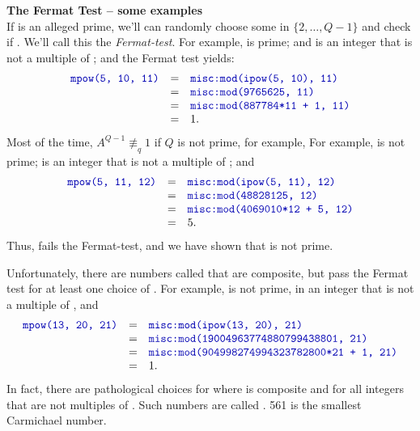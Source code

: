 \documentclass{article}
\newcommand{\nequivq}{{\not\equiv}_q}
\begin{document}
  \noindent%
  \textbf{The Fermat Test -- some examples}\\
  If  is an alleged prime, we'll can randomly choose some  in $\{2, \ldots, Q-1\}$
  and check if .  We'll call this the \emph{Fermat-test}.
  For example,  is prime; and  is an integer that is not a multiple of ;
  and the Fermat test yields:
  \begin{displaymath}\begin{array}{rcl}
    \code{mpow(5, 10, 11)} &=& \code{misc:mod(ipow(5, 10), 11)}\\
			   &=& \code{misc:mod(9765625, 11)}\\
			   &=& \code{misc:mod(887784*11 + 1, 11)}\\
			   &=& 1.
  \end{array}\end{displaymath}
   Most of the time, $A^{Q-1} \nequivq 1$ if $Q$ is not prime, for example,
   For example,  is not prime;  is an integer that is not a multiple of ; and
   \begin{displaymath}\begin{array}{rcl}
     \code{mpow(5, 11, 12)} &=& \code{misc:mod(ipow(5, 11), 12)}\\
			    &=& \code{misc:mod(48828125, 12)}\\
			    &=& \code{misc:mod(4069010*12 + 5, 12)}\\
			    &=& 5.
   \end{array}\end{displaymath}
   Thus,  fails the Fermat-test, and we have shown that  is not prime.

   Unfortunately, there are numbers called
    that are composite,
   but pass the Fermat test for at least one choice of .
   For example,  is not prime,  in an integer that is not a multiple of , and
   \begin{displaymath}\begin{array}{rcl}
     \code{mpow(13, 20, 21)} &=& \code{misc:mod(ipow(13, 20), 21)}\\
			     &=& \code{misc:mod(19004963774880799438801, 21)}\\
			     &=& \code{misc:mod(904998274994323782800*21 + 1, 21)}\\
			     &=& 1.
   \end{array}\end{displaymath}
   In fact, there are pathological choices for  where  is composite and
    for all integers  that are not multiples of .
   Such numbers are called
   .
   561 is the smallest Carmichael number.
\end{document}
